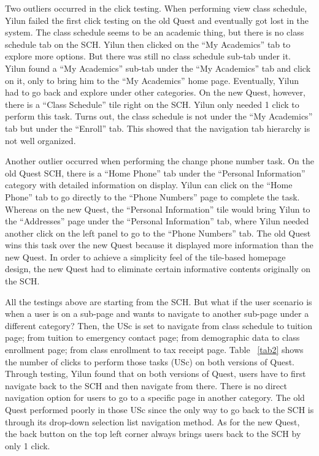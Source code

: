 \documentclass[conference]{IEEEtran}
\begin{document}
Two outliers occurred in the click testing. When performing view class schedule, Yilun failed the first click testing on the old Quest and eventually got lost in the system. The class schedule seems to be an academic thing, but there is no class schedule tab on the SCH. Yilun then clicked on the ``My Academics'' tab to explore more options. But there was still no class schedule sub-tab under it. Yilun found a ``My Academics'' sub-tab under the ``My Academics'' tab and click on it, only to bring him to the ``My Academics'' home page. Eventually, Yilun had to go back and explore under other categories. On the new Quest, however, there is a ``Class Schedule'' tile right on the SCH. Yilun only needed 1 click to perform this task. Turns out, the class schedule is not under the ``My Academics'' tab but under the ``Enroll'' tab. This showed that the navigation tab hierarchy is not well organized. 

Another outlier occurred when performing the change phone number task. On the old Quest SCH, there is a ``Home Phone'' tab under the ``Personal Information'' category with detailed information on display. Yilun can click on the ``Home Phone'' tab to go directly to the ``Phone Numbers'' page to complete the task. Whereas on the new Quest, the ``Personal Information'' tile would bring Yilun to the ``Addresses'' page under the ``Personal Information'' tab, where Yilun needed another click on the left panel to go to the ``Phone Numbers'' tab. The old Quest wins this task over the new Quest because it displayed more information than the new Quest. In order to achieve a simplicity feel of the tile-based homepage design, the new Quest had to eliminate certain informative contents originally on the SCH.

All the testings above are starting from the SCH. But what if the user scenario is when a user is on a sub-page and wants to navigate to another sub-page under a different category? Then, the USc is set to navigate from class schedule to tuition page; from tuition to emergency contact page; from demographic data to class enrollment page; from class enrollment to tax receipt page. Table ~\ref{tab2} shows the number of clicks to perform those tasks (USc) on both versions of Quest. Through testing, Yilun found that on both versions of Quest, users have to first navigate back to the SCH and then navigate from there. There is no direct navigation option for users to go to a specific page in another category. The old Quest performed poorly in those USc since the only way to go back to the SCH is through its drop-down selection list navigation method. As for the new Quest, the back button on the top left corner always brings users back to the SCH by only 1 click.
\end{document}
